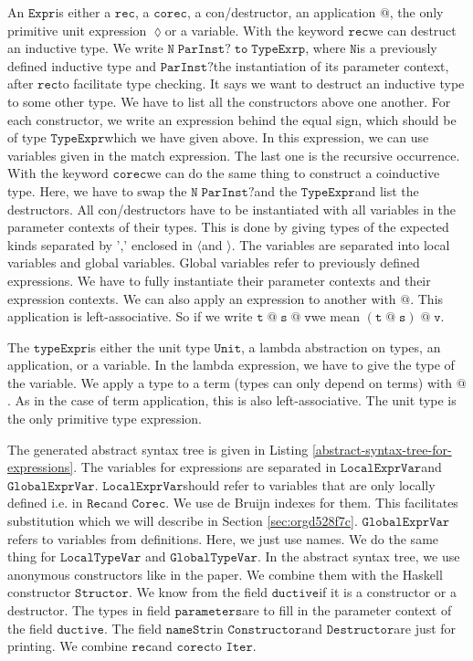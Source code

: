 \documentclass[a4paper,cleardoubleempty,BCOR1cm]{scrbook}
\begin{document}
An $\mathtt{Expr}$\;is either a $\mathtt{rec}$, a $\mathtt{corec}$, a con/destructor, an application
$\mathtt{@}$, the only primitive unit expression $\mathtt{\lozenge}$\;or a variable. With the
keyword $\mathtt{rec}$\;we can destruct an inductive type. We write
$\mathtt{N\;ParInst?\;to\;TypeExrp}$, where $\mathtt{N}$\;is a previously defined inductive type
and $\mathtt{ParInst?}$\;the instantiation of its parameter context, after $\mathtt{rec}$\;to
facilitate type checking. It says we want to destruct an inductive type to
some other type. We have to list all the constructors above one another.
For each constructor, we write an expression behind the equal sign, which
should be of type $\mathtt{TypeExpr}$\;which we have given above. In this expression,
we can use variables given in the match expression. The last one is the
recursive occurrence. With the keyword $\mathtt{corec}$\;we can do the same thing to
construct a coinductive type. Here, we have to swap the $\mathtt{N\;ParInst?}$\;and the
$\mathtt{TypeExpr}$\;and list the destructors. All con/destructors have to be
instantiated with all variables in the parameter contexts of their types.
This is done by giving types of the expected kinds separated by ',' enclosed
in $\mathtt{\langle}$\;and $\mathtt{\rangle}$. The variables are separated into local variables
and global variables. Global variables refer to previously defined
expressions. We have to fully instantiate their parameter contexts and their
expression contexts. We can also apply an expression to another with $\mathtt{@}$.
This application is left-associative.  So if we write $\mathtt{t\;@\;s\;@\;v}$\;we mean
$\mathtt{(t\;@\;s)\;@\;v}$.

The $\mathtt{typeExpr}$\;is either the unit type $\mathtt{Unit}$, a lambda abstraction on
types, an application, or a variable. In the lambda expression, we have to
give the type of the variable. We apply a type to a term (types can only
depend on terms) with $\mathtt{@}$.  As in the case of term application, this is
also left-associative.  The unit type is the only primitive type
expression.

The generated abstract syntax tree is given in Listing
\ref{abstract-syntax-tree-for-expressions}. The variables for expressions are
separated in $\mathtt{LocalExprVar}$\;and $\mathtt{GlobalExprVar}$. $\mathtt{LocalExprVar}$\;should refer
to variables that are only locally defined i.e. in $\mathtt{Rec}$\;and $\mathtt{Corec}$. We
use de Bruijn indexes for them. This facilitates substitution which we will
describe in Section \ref{sec:orgd528f7c}. $\mathtt{GlobalExprVar}$\;refers to variables from
definitions. Here, we just use names. We do the same thing for $\mathtt{LocalTypeVar}$
and $\mathtt{GlobalTypeVar}$. In the abstract syntax tree, we use anonymous
constructors like in the paper. We combine them with the Haskell constructor
$\mathtt{Structor}$. We know from the field $\mathtt{ductive}$\;if it is a constructor or a
destructor. The types in field $\mathtt{parameters}$\;are to fill in the parameter
context of the field $\mathtt{ductive}$. The field $\mathtt{nameStr}$\;in $\mathtt{Constructor}$\;and
$\mathtt{Destructor}$\;are just for printing. We combine $\mathtt{rec}$\;and $\mathtt{corec}$\;to $\mathtt{Iter}$.
\end{document}
